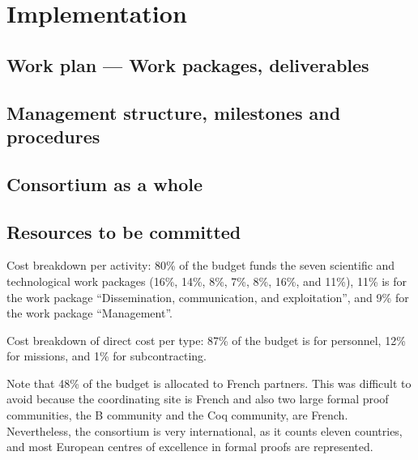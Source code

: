 \chapter{Implementation}\label{chap:implementation}

\section{Work plan --- Work packages, deliverables}



\section{Management structure, milestones and procedures}



\section{Consortium as a whole}\label{sec:consortium}



\section{Resources to be committed}\label{sec:resources}

\wpfigstyle{\scriptsize\setlength{\tabcolsep}{2pt}}
\wpfig%

Cost breakdown per activity:
80\% of the budget funds the seven scientific and technological work
packages (16\%, 14\%, 8\%, 7\%, 8\%, 16\%, and 11\%), 11\% is for the
work package ``Dissemination, communication, and exploitation'', and
9\% for the work package ``Management''.

Cost breakdown of direct cost per type: 87\% of the budget is for personnel,
12\% for missions, and 1\% for subcontracting.

Note that 48\% of the budget is allocated to French partners.  This
was difficult to avoid because the coordinating site is French and
also two large formal proof communities, the B community and the Coq
community, are French.  Nevertheless, the consortium is very
international, as it counts eleven countries, and most European
centres of excellence in formal proofs are represented.

